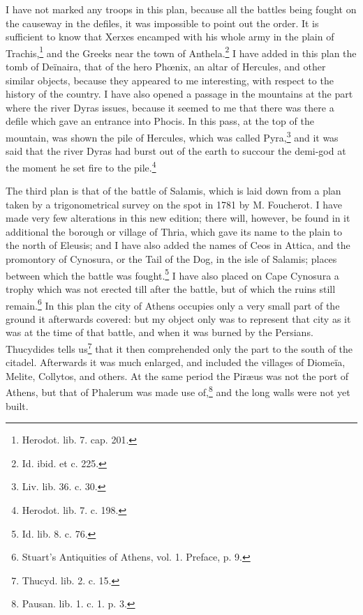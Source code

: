 \documentclass[a4paper, 11pt, oneside, polutonikogreek, english]{article}
\begin{document}
I have not marked any troops in this plan, because all the battles being fought on the causeway in the defiles, it was impossible to point out the order. It is sufficient to know that Xerxes encamped with his whole army in the plain of Trachis,\footnote{Herodot. lib. 7. cap. 201.} and the Greeks near the town of Anthela.\footnote{Id. ibid. et c. 225.} I have added in this plan the tomb of Deïnaira, that of the hero Phœnix, an altar of Hercules, and other similar objects, because they appeared to me interesting, with respect to the history of the country. I have also opened a passage in the mountains at the part where the river Dyras issues, because it seemed to me that there was there a defile which gave an entrance into Phocis. In this pass, at the top of the mountain, was shown the pile of Hercules, which was called Pyra,\footnote{Liv. lib. 36. c. 30.} and it was said that the river Dyras had burst out of the earth to succour the demi-god at the moment he set fire to the pile.\footnote{Herodot. lib. 7. c. 198.}

The third plan is that of the battle of Salamis, which is laid down from a plan taken by a trigonometrical survey on the spot in 1781 by M. Foucherot. I have made very few alterations in this new edition; there will, however, be found in it additional the borough or village of Thria, which gave its name to the plain to the north of Eleusis; and I have also added the names of Ceos in Attica, and the promontory of Cynosura, or the Tail of the Dog, in the isle of Salamis; places between which the battle was fought.\footnote{Id. lib. 8. c. 76.} I have also placed on Cape Cynosura a trophy which was not erected till after the battle, but of which the ruins still remain.\footnote{Stuart's Antiquities of Athens, vol. 1. Preface, p. 9.} In this plan the city of Athens occupies only a very small part of the ground it afterwards covered: but my object only was to represent that city as it was at the time of that battle, and when it was burned by the Persians. Thucydides tells us\footnote{Thucyd. lib. 2. c. 15.} that it then comprehended only the part to the south of the citadel. Afterwards it was much enlarged, and included the villages of Diomeïa, Melite, Collytos, and others. At the same period the Piræus was not the port of Athens, but that of Phalerum was made use of,\footnote{Pausan. lib. 1. c. 1. p. 3.} and the long walls were not yet built.
\end{document}
